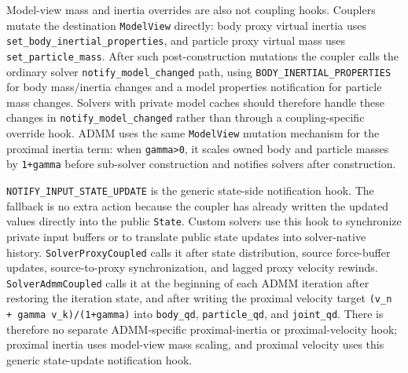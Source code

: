 \documentclass[11pt]{article}
\begin{document}
Model-view mass and inertia overrides are also not coupling hooks.  Couplers
mutate the destination \texttt{ModelView} directly: body proxy virtual inertia
uses \texttt{set\_body\_inertial\_properties}, and particle proxy virtual mass
uses \texttt{set\_particle\_mass}.  After such post-construction mutations the
coupler calls the ordinary solver \texttt{notify\_model\_changed} path, using
\texttt{BODY\_INERTIAL\_PROPERTIES} for body mass/inertia changes and a model
properties notification for particle mass changes. Solvers with private model
caches should therefore handle these changes in \texttt{notify\_model\_changed}
rather than through a coupling-specific override hook. ADMM uses the same
\texttt{ModelView} mutation mechanism for the proximal inertia term: when
\texttt{gamma>0}, it scales owned body and particle masses by \texttt{1+gamma}
before sub-solver construction and notifies solvers after construction.

\texttt{NOTIFY\_INPUT\_STATE\_UPDATE} is the generic state-side notification
hook. The fallback is no extra action because the coupler has already written
the updated values directly into the public \texttt{State}. Custom solvers use
this hook to synchronize private input buffers or to translate public state
updates into solver-native history. \texttt{SolverProxyCoupled} calls it after
state distribution, source force-buffer updates, source-to-proxy synchronization,
and lagged proxy velocity rewinds. \texttt{SolverAdmmCoupled} calls it at the
beginning of each ADMM iteration after restoring the iteration state, and after
writing the proximal velocity target
\texttt{(v\_n + gamma v\_k)/(1+gamma)} into \texttt{body\_qd},
\texttt{particle\_qd}, and \texttt{joint\_qd}. There is therefore no separate
ADMM-specific proximal-inertia or proximal-velocity hook; proximal inertia uses
model-view mass scaling, and proximal velocity uses this generic state-update
notification hook.
\end{document}
